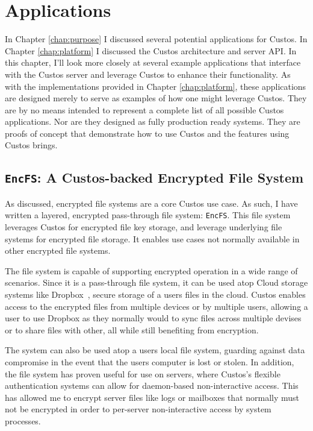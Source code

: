 \chapter{Applications}
\label{chap:clients}

In Chapter \ref{chap:purpose} I discussed several potential
applications for Custos. In Chapter \ref{chap:platform} I discussed
the Custos architecture and server API. In this chapter, I'll look
more closely at several example applications that interface with the
Custos server and leverage Custos to enhance their functionality. As
with the implementations provided in Chapter \ref{chap:platform},
these applications are designed merely to serve as examples of how one
might leverage Custos. They are by no means intended to represent a
complete list of all possible Custos applications. Nor are they
designed as fully production ready systems. They are proofs of concept
that demonstrate how to use Custos and the features using Custos
brings.

\section{\texttt{EncFS}: A Custos-backed Encrypted File System}

As discussed, encrypted file systems are a core Custos use case. As
such, I have written a layered, encrypted pass-through file system:
\texttt{EncFS}. This file system leverages Custos for encrypted file
key storage, and leverage underlying file systems for encrypted file
storage. It enables use cases not normally available in other
encrypted file systems.

The file system is capable of supporting encrypted operation in a wide
range of scenarios. Since it is a pass-through file system, it can be
used atop Cloud storage systems like Dropbox~\cite{dropbox}, secure
storage of a users files in the cloud. Custos enables access to the
encrypted files from multiple devices or by multiple users, allowing a
user to use Dropbox as they normally would to sync files across
multiple devises or to share files with other, all while still
benefiting from encryption.

The system can also be used atop a users local file system, guarding
against data compromise in the event that the users computer is lost
or stolen. In addition, the file system has proven useful for use on
servers, where Custos's flexible authentication systems can allow for
daemon-based non-interactive access. This has allowed me to encrypt
server files like logs or mailboxes that normally must not be
encrypted in order to per-server non-interactive access by system
processes.

